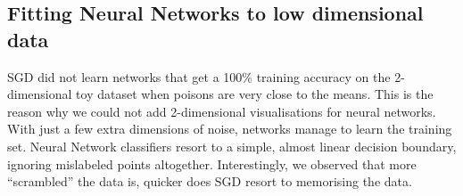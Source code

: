\documentclass{ociamthesis}
\begin{document}
\begin{appendices}
    
\chapter{Fitting Neural Networks to low dimensional data}

SGD did not learn networks that get a 100\% training accuracy on the
2-dimensional toy dataset when poisons are very close to the means. This is the
reason why we could not add 2-dimensional visualisations for neural networks.
With just a few extra dimensions of noise, networks manage to learn the training
set. Neural Network classifiers resort to a simple, almost linear decision
boundary, ignoring mislabeled points altogether. Interestingly, we observed that
more ``scrambled'' the data is, quicker does SGD resort to memorising the data.


\end{appendices}
\end{document}
